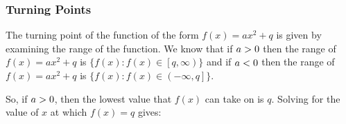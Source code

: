             \subsubsection{ Turning Points}
            \nopagebreak
          \label{m39345*id243854}The turning point of the function of the form $f\left(x\right)=a{x}^{2}+q$ is given by examining the range of the function. We know that if $a>{}0$ then the range of $f\left(x\right)=a{x}^{2}+q$ is $\{f\left(x\right):f\left(x\right)\in \left[q,\infty \right)\}$ and if $a<{}0$ then the range of $f\left(x\right)=a{x}^{2}+q$ is $\{f\left(x\right):f\left(x\right)\in \left(-\infty ,q\right]\}$.\par 
          \label{m39345*id244081}So, if $a>{}0$, then the lowest value that $f\left(x\right)$ can take on is $q$. Solving for the value of $x$ at which $f\left(x\right)=q$ gives:\par 
          \label{m39345*id244157}\nopagebreak\noindent{}
